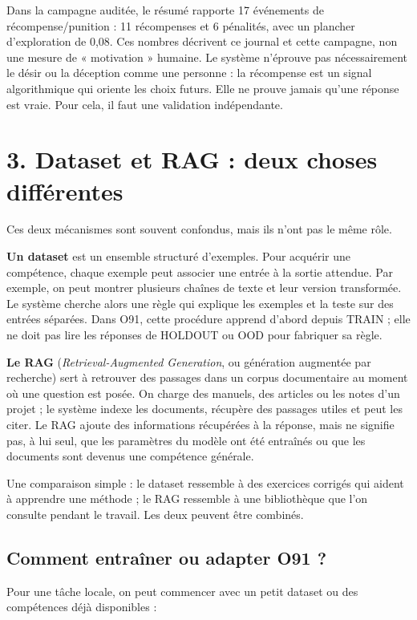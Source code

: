 \documentclass[11pt,a4paper]{article}
\begin{document}
Dans la campagne auditée, le résumé rapporte 17 événements de récompense/punition : 11 récompenses et 6 pénalités, avec un plancher d'exploration de 0,08. Ces nombres décrivent ce journal et cette campagne, non une mesure de « motivation » humaine. Le système n'éprouve pas nécessairement le désir ou la déception comme une personne : la récompense est un signal algorithmique qui oriente les choix futurs. Elle ne prouve jamais qu'une réponse est vraie. Pour cela, il faut une validation indépendante.

\section*{3. Dataset et RAG : deux choses différentes}

Ces deux mécanismes sont souvent confondus, mais ils n'ont pas le même rôle.

\textbf{Un dataset} est un ensemble structuré d'exemples. Pour acquérir une compétence, chaque exemple peut associer une entrée à la sortie attendue. Par exemple, on peut montrer plusieurs chaînes de texte et leur version transformée. Le système cherche alors une règle qui explique les exemples et la teste sur des entrées séparées. Dans O91, cette procédure apprend d'abord depuis TRAIN ; elle ne doit pas lire les réponses de HOLDOUT ou OOD pour fabriquer sa règle.

\textbf{Le RAG} (\emph{Retrieval-Augmented Generation}, ou génération augmentée par recherche) sert à retrouver des passages dans un corpus documentaire au moment où une question est posée. On charge des manuels, des articles ou les notes d'un projet ; le système indexe les documents, récupère des passages utiles et peut les citer. Le RAG ajoute des informations récupérées à la réponse, mais ne signifie pas, à lui seul, que les paramètres du modèle ont été entraînés ou que les documents sont devenus une compétence générale.

Une comparaison simple : le dataset ressemble à des exercices corrigés qui aident à apprendre une méthode ; le RAG ressemble à une bibliothèque que l'on consulte pendant le travail. Les deux peuvent être combinés.

\subsection*{Comment entraîner ou adapter O91 ?}

Pour une tâche locale, on peut commencer avec un petit dataset ou des compétences déjà disponibles :
\end{document}
